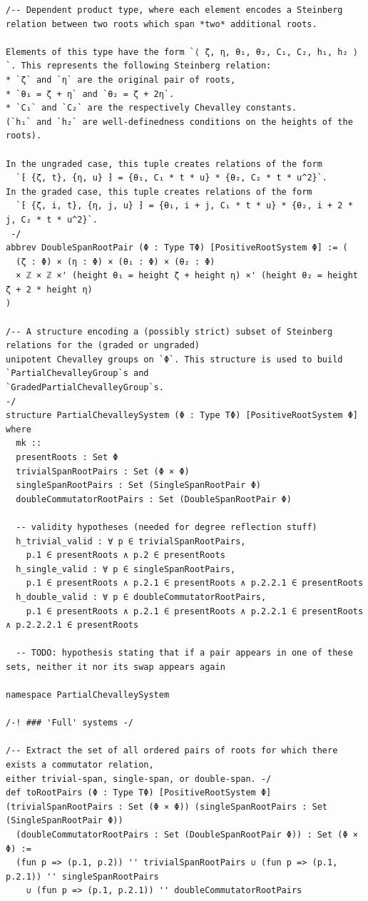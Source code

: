 \documentclass[10pt,a4paper]{article}
\begin{document}
\begin{Verbatim}
/-- Dependent product type, where each element encodes a Steinberg relation between two roots which span *two* additional roots.

Elements of this type have the form `⟨ ζ, η, θ₁, θ₂, C₁, C₂, h₁, h₂ ⟩`. This represents the following Steinberg relation:
* `ζ` and `η` are the original pair of roots,
* `θ₁ = ζ + η` and `θ₂ = ζ + 2η`.
* `C₁` and `C₂` are the respectively Chevalley constants.
(`h₁` and `h₂` are well-definedness conditions on the heights of the roots).

In the ungraded case, this tuple creates relations of the form
  `⁅ {ζ, t}, {η, u} ⁆ = {θ₁, C₁ * t * u} * {θ₂, C₂ * t * u^2}`.
In the graded case, this tuple creates relations of the form
  `⁅ {ζ, i, t}, {η, j, u} ⁆ = {θ₁, i + j, C₁ * t * u} * {θ₂, i + 2 * j, C₂ * t * u^2}`.
 -/
abbrev DoubleSpanRootPair (Φ : Type TΦ) [PositiveRootSystem Φ] := (
  (ζ : Φ) × (η : Φ) × (θ₁ : Φ) × (θ₂ : Φ)
  × ℤ × ℤ ×' (height θ₁ = height ζ + height η) ×' (height θ₂ = height ζ + 2 * height η)
)

/-- A structure encoding a (possibly strict) subset of Steinberg relations for the (graded or ungraded)
unipotent Chevalley groups on `Φ`. This structure is used to build `PartialChevalleyGroup`s and
`GradedPartialChevalleyGroup`s.
-/
structure PartialChevalleySystem (Φ : Type TΦ) [PositiveRootSystem Φ] where
  mk ::
  presentRoots : Set Φ
  trivialSpanRootPairs : Set (Φ × Φ)
  singleSpanRootPairs : Set (SingleSpanRootPair Φ)
  doubleCommutatorRootPairs : Set (DoubleSpanRootPair Φ)

  -- validity hypotheses (needed for degree reflection stuff)
  h_trivial_valid : ∀ p ∈ trivialSpanRootPairs,
    p.1 ∈ presentRoots ∧ p.2 ∈ presentRoots
  h_single_valid : ∀ p ∈ singleSpanRootPairs,
    p.1 ∈ presentRoots ∧ p.2.1 ∈ presentRoots ∧ p.2.2.1 ∈ presentRoots
  h_double_valid : ∀ p ∈ doubleCommutatorRootPairs,
    p.1 ∈ presentRoots ∧ p.2.1 ∈ presentRoots ∧ p.2.2.1 ∈ presentRoots ∧ p.2.2.2.1 ∈ presentRoots

  -- TODO: hypothesis stating that if a pair appears in one of these sets, neither it nor its swap appears again

namespace PartialChevalleySystem

/-! ### 'Full' systems -/

/-- Extract the set of all ordered pairs of roots for which there exists a commutator relation,
either trivial-span, single-span, or double-span. -/
def toRootPairs (Φ : Type TΦ) [PositiveRootSystem Φ] (trivialSpanRootPairs : Set (Φ × Φ)) (singleSpanRootPairs : Set (SingleSpanRootPair Φ))
  (doubleCommutatorRootPairs : Set (DoubleSpanRootPair Φ)) : Set (Φ × Φ) :=
  (fun p => (p.1, p.2)) '' trivialSpanRootPairs ∪ (fun p => (p.1, p.2.1)) '' singleSpanRootPairs
    ∪ (fun p => (p.1, p.2.1)) '' doubleCommutatorRootPairs


\end{Verbatim}
\end{document}
